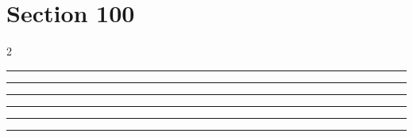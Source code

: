 \documentclass[11pt,a4paper]{article}
\begin{document}
\section{Section 100}
\begin{multicols}{2}
\begin{swarmwrap}%
  \begin{minipage}[t]{2cm}
    \centering
    \textcolor{blue!30}{\rule{\linewidth}{3cm}}
  \end{minipage}%
\end{swarmwrap}%
\swarmwrapnext\lipsum[1]\lipsum[2]
\end{multicols}
\begin{swarmwrap}%
  \begin{minipage}[t]{3cm}
    \centering
    \textcolor{red!20}{\rule{\linewidth}{4cm}}
  \end{minipage}%
\end{swarmwrap}%
\swarmwrapnext\lipsum[1]\lipsum[2]\lipsum[3]\lipsum[4]\lipsum[5]\lipsum[6]
\begin{swarmwrap}%
  \begin{minipage}[t]{4cm}
    \centering
    \textcolor{red!20}{\rule{\linewidth}{5cm}}
  \end{minipage}%
\end{swarmwrap}%
\swarmwrapnext\lipsum[1]
\begin{swarmwrap}%
  \begin{minipage}[t]{5cm}
    \centering
    \textcolor{red!20}{\rule{\linewidth}{6cm}}
  \end{minipage}%
\end{swarmwrap}%
\swarmwrapnext\lipsum[1]\lipsum[2]
\begin{swarmwrap}%
  \begin{minipage}[t]{2cm}
    \centering
    \textcolor{red!20}{\rule{\linewidth}{7cm}}
  \end{minipage}%
\end{swarmwrap}%
\swarmwrapnext\lipsum[1]\lipsum[2]\lipsum[3]
\begin{swarmwrap}%
  \begin{minipage}[t]{3cm}
    \centering
    \textcolor{red!20}{\rule{\linewidth}{8cm}}
  \end{minipage}%
\end{swarmwrap}%
\swarmwrapnext\lipsum[1]\lipsum[2]\lipsum[3]\lipsum[4]
\end{document}
